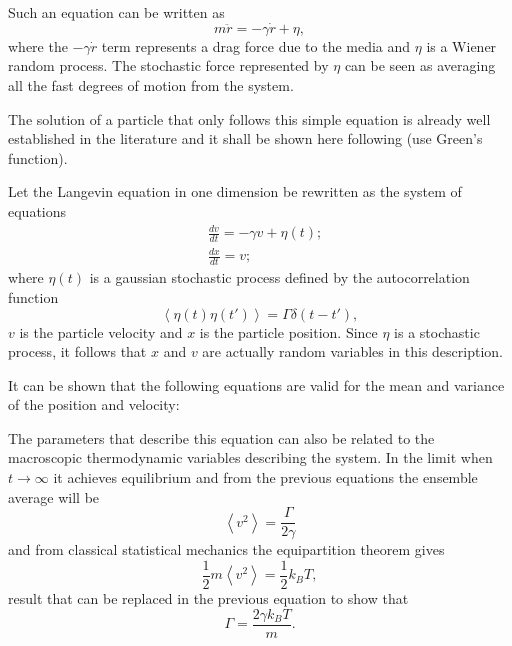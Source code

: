 Such an equation can be written as
\[ m\ddot{r} = -\gamma \dot{r} + \eta,\]
where the $ -\gamma \dot{r} $ term represents a drag force due to the media and $ \eta $ is a Wiener random process. The stochastic force represented by $ \eta $ can be seen as averaging all the fast degrees of motion from the system.

The solution of a particle that only follows this simple equation is already well established in the literature and it shall be shown here following \cite{tomeDinamicaEstocastica2014} (use Green's function). 

Let the Langevin equation in one dimension be rewritten as the system of equations
\begin{equation}
\begin{aligned}
&\frac{dv}{dt} = -\gamma v + \eta\left(t\right); \\
&\frac{dx}{dt} = v;
\end{aligned}
\end{equation}
where $\eta\left(t\right)$ is a gaussian stochastic process defined by the autocorrelation function
$$ \left< \eta\left(t\right) \eta\left(t'\right)\right> = \Gamma \delta\left(t - t'\right), $$ 
$ v $ is the particle velocity and $ x $ is the particle position. Since $ \eta $ is a stochastic process, it follows that $ x $ and $ v $ are actually random variables in this description.

It can be shown that the following equations are valid for the mean and variance of the position and velocity:


The parameters that describe this equation can also be related to the macroscopic thermodynamic variables describing the system. In the limit when $t \rightarrow \infty$ it achieves equilibrium and from the previous equations the ensemble average will be
$$ \left< v^{2} \right> = \frac{\Gamma}{2\gamma} $$
and from classical statistical mechanics the equipartition theorem gives
$$ \frac{1}{2} m \left< v^{2} \right> = \frac{1}{2}k_{B}T, $$
result that can be replaced in the previous equation to show that
$$ \Gamma = \frac{2\gamma k_{B}T}{m}.$$

